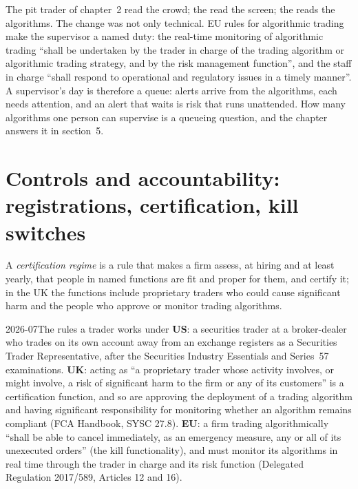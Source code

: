 The pit trader of chapter~2 read the crowd; the  read the screen; the  reads the
algorithms. The change was not only technical. EU rules for algorithmic trading make the supervisor a named duty: the
real-time monitoring of algorithmic trading ``shall be undertaken by the trader in charge of the trading algorithm or
algorithmic trading strategy, and by the risk management function'', and the staff in charge ``shall respond to
operational and regulatory issues in a timely manner''. A supervisor's day is therefore a queue: alerts arrive from the
algorithms, each needs attention, and an alert that waits is risk that runs unattended. How many algorithms one person
can supervise is a queueing question, and the chapter answers it in section~5.

\section{Controls and accountability: registrations, certification, kill switches}

\begin{definition}\label{def:in:trader:certification}
A \emph{certification regime} is a rule that makes a firm assess, at hiring and at least
yearly, that people in named functions are fit and proper for them, and certify it; in the UK the functions include
proprietary traders who could cause significant harm and the people who approve or monitor trading algorithms.
\end{definition}

\begin{dated}{2026-07}{The rules a trader works under}\label{dat:in:trader:controls}
\textbf{US}: a securities trader at a broker-dealer who trades on its own account away from an exchange registers as a
Securities Trader Representative, after the Securities Industry Essentials and Series~57 examinations. \textbf{UK}: acting
as ``a proprietary trader whose activity involves, or might involve, a risk of significant harm to the firm or any of its
customers'' is a certification function, and so are approving the deployment of a trading algorithm and having
significant responsibility for monitoring whether an algorithm remains compliant (FCA Handbook, SYSC 27.8). \textbf{EU}: a
firm trading algorithmically ``shall be able to cancel immediately, as an emergency measure, any or all of its unexecuted
orders'' (the kill functionality), and must monitor its algorithms in real time through the trader in charge and its risk
function (Delegated Regulation 2017/589, Articles 12 and 16).
\end{dated}

